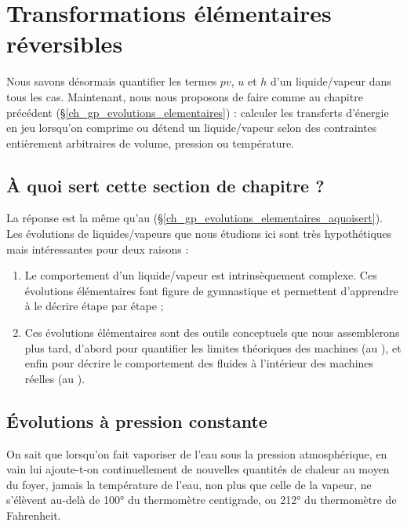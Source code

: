 \section{Transformations élémentaires réversibles}
\label{ch_lv_evolutions_elementaires}

	Nous savons désormais quantifier les termes $pv$, $u$ et $h$ d’un liquide/vapeur dans tous les cas. Maintenant, nous nous proposons de faire comme au chapitre précédent (\S\ref{ch_gp_evolutions_elementaires}) : calculer les transferts d’énergie en jeu lorsqu’on comprime ou détend un liquide/vapeur selon des contraintes entièrement arbitraires de volume, pression ou température.


	\subsection{À quoi sert cette section de chapitre ?}
	\label{ch_lv_evolutions_elementaires_aquoisert}

		La réponse est la même qu’au \coursquatreshort (\S\ref{ch_gp_evolutions_elementaires_aquoisert}). Les évolutions de liquides/vapeurs que nous étudions ici sont très hypothétiques mais intéressantes pour deux raisons :

		\begin{enumerate}
			\item Le comportement d’un liquide/vapeur est intrinsèquement complexe. Ces évolutions élémentaires font figure de gymnastique et permettent d’apprendre à le décrire étape par étape ;
			\item Ces évolutions élémentaires sont des outils conceptuels que nous assemblerons plus tard, d’abord pour quantifier les limites théoriques des machines (au \coursseptshort), et enfin pour décrire le comportement des fluides à l’intérieur des machines réelles (au \coursneufshort).
		\end{enumerate}


	\subsection{Évolutions à pression constante}
	\label{ch_lv_isobare}

	On sait que lorsqu’on fait vaporiser de l’eau sous la pression atmosphérique, en vain lui ajoute-t-on continuellement de nouvelles quantités de chaleur au moyen du foyer, jamais la température de l’eau, non plus que celle de la vapeur, ne s’élèvent au-delà de 100° du thermomètre centigrade, ou 212° du thermomètre de Fahrenheit.


